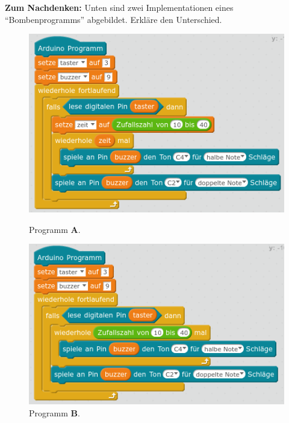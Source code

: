 \documentclass[ngerman, 11pt]{scrreprt}
\begin{document}
	\bigskip
	
	
	\newpage
	\setcounter{chapter}{4}
	\setcounter{section}{3}

	
	\begin{ziel}
		\textbf{Zum Nachdenken:} Unten sind zwei Implementationen eines \enquote{Bombenprogramms} abgebildet. Erkläre den Unterschied.
	\end{ziel}
	
	\bigskip
	\begin{figure}[H]
		\begin{minipage}{0.49\textwidth}
			\centering
			\includegraphics[width=\textwidth]{../lsg/4-3-Bombe-Lsg1.png}
			\caption{Programm \textbf{A}.}
		\end{minipage}
		\hfill
		\begin{minipage}{0.49\textwidth}
			\centering
			\includegraphics[width=\textwidth]{../lsg/4-3-Bombe-Lsg2.png}
			\caption{Programm \textbf{B}.}
		\end{minipage}
	\end{figure}
	
	\bigskip
	
\end{document}
